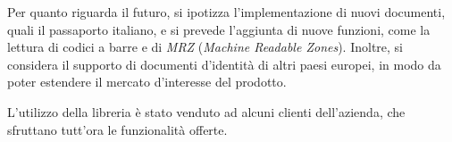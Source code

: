 Per quanto riguarda il futuro, si ipotizza l'implementazione di nuovi documenti, quali il passaporto italiano, e si prevede l'aggiunta di nuove funzioni, come la lettura di codici a barre e di \textit{MRZ} (\textit{Machine Readable Zones}). Inoltre, si considera il supporto di documenti d'identit\`a di altri paesi europei, in modo da poter estendere il mercato d'interesse del prodotto.\par
L'utilizzo della libreria \`e stato venduto ad alcuni clienti dell'azienda, che sfruttano tutt'ora le funzionalit\`a offerte.
